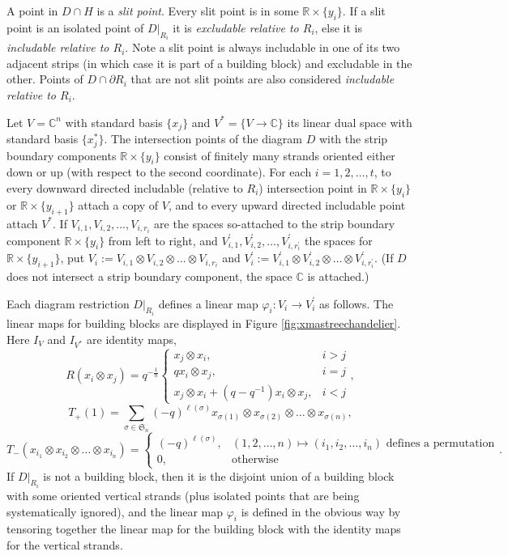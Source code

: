 \documentclass[12pt, reqno]{amsart}
\theoremstyle{definition}
\newcommand{\R}{\mathbb{R}}%
\begin{document}
A point in $D\cap H$ is a \emph{slit point}.  Every slit point is in some $\R\times\{y_i\}$.  If a slit point is an isolated point of $D|_{R_i}$ it is \emph{excludable relative to $R_i$}, else it is \emph{includable relative to $R_i$}.   Note a slit point is always includable in one of its two adjacent strips (in which case it is part of a building block) and excludable in the other.  Points of $D\cap\partial R_i$ that are not slit points are also considered \emph{includable relative to $R_i$}.  

Let $V=\mathbb{C}^n$ with standard basis $\{x_j\}$ and $V^*=\{V\to\mathbb{C}\}$ its linear dual space with standard basis $\{x^*_j\}$.  The intersection points of the diagram $D$ with the strip boundary components $\R\times\{y_i\}$ consist of finitely many strands oriented either down or up (with respect to the second coordinate).  For each $i=1,2,\dots,t$, to every downward directed includable (relative to $R_i$) intersection point in $\R\times\{y_i\}$ or $\R\times\{y_{i+1}\}$ attach a copy of $V$, and to every upward directed includable point attach $V^*$. If $V_{i,1}, V_{i,2}, \dots, V_{i,r_i}$ are the spaces so-attached to the strip boundary component $\R\times\{y_i\}$ from left to right, and $V^\prime_{i,1}, V^\prime_{i,2}, \dots, V^\prime_{i,r^\prime_i}$ the spaces for $\R\times\{y_{i+1}\}$, put $V_i:=V_{i,1}\otimes V_{i,2}\otimes\dots\otimes V_{i,r_i}$ and $V^\prime_i:=V^\prime_{i,1}\otimes V^\prime_{i,2}\otimes\dots\otimes V^\prime_{i,r^\prime_i}$.  (If $D$ does not intersect a strip boundary component, the space $\mathbb{C}$ is attached.)

Each diagram restriction $D|_{R_i}$ defines a linear map $\varphi_i:V_i\to V^\prime_{i}$ as follows.  The linear maps for building blocks are displayed in Figure \ref{fig:xmastreechandelier}.  Here $I_V$ and $I_{V^*}$ are identity maps, 
$$
R(x_i\otimes x_j) = q^{-\frac{1}{n}}
\begin{cases}
x_j \otimes x_i, & i>j \\
q  x_i \otimes x_j, & i=j \\
x_j \otimes x_i +(q-q^{-1})x_i\otimes x_j, & i<j
\end{cases},
$$
$$
T_+(1) = \sum_{\sigma \in \mathfrak{S}_n} (-q)^{\ell(\sigma)}x_{\sigma(1)}\otimes x_{\sigma(2)}\otimes \dots \otimes x_{\sigma(n)},
$$
$$
T_-(x_{i_1}\otimes x_{i_2}\otimes\dots \otimes x_{i_n}) = 
\begin{cases}
(-q)^{\ell(\sigma)}, & (1,2,\ldots,n) \mapsto (i_1,i_2,\ldots,i_n) \text{ defines a permutation}\\
0, & \text{otherwise}
\end{cases}.
$$ 
If $D|_{R_i}$ is not a building block, then it is the disjoint union of a building block with some oriented vertical strands (plus isolated points that are being systematically ignored), and the linear map $\varphi_i$ is defined in the obvious way by tensoring together the linear map for the building block with the identity maps for the vertical strands.  
\end{document}
